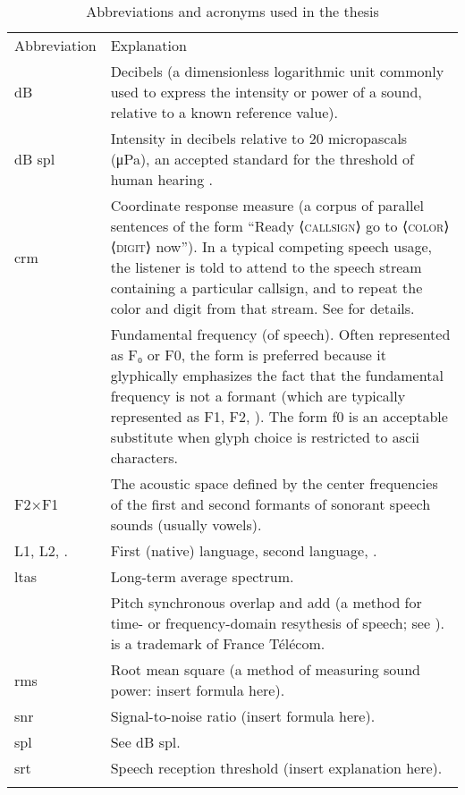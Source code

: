\begin{table}
	\caption[Abbreviations and acronyms]{Abbreviations and acronyms used in the thesis \label{tab:Abbr}}
	\centering
	\begin{tabu} to \textwidth [c]{X[c m] X[5 m]}
		\toprule
		\everyrow{\midrule}
		\rowfont[c]{\bfseries} Abbreviation & Explanation\\
		{dB} & Decibels (a dimensionless logarithmic unit commonly used to express the intensity or power of a sound, relative to a known reference value).\\ 
		{dB \ac{spl}} & Intensity in decibels relative to 20 micropascals (μPa), an accepted standard for the threshold of human hearing .\\
		\ac{crm} & Coordinate response measure (a corpus of parallel sentences of the form “Ready ⟨\textsc{callsign}⟩ go to ⟨\textsc{color}⟩ ⟨\textsc{digit}⟩ now”).  In a typical competing speech usage, the listener is told to attend to the speech stream containing a particular callsign, and to repeat the color and digit from that stream.  See \citet{BoliaEtAl2000} for details.\\
		\fo & Fundamental frequency (of speech).  Often represented as F₀ or F0, the form \fo{} is preferred because it glyphically emphasizes the fact that the fundamental frequency is not a formant (which are typically represented as F1, F2, \etc).  The form f0 is an acceptable substitute when glyph choice is restricted to \ac{ascii} characters.\\
		F2×F1 & The acoustic space defined by the center frequencies of the first and second formants of sonorant speech sounds (usually vowels).\\
		L1, L2, \etc. & First (native) language, second language, \etc.\\
		\ac{ltas} & Long-term average spectrum.\\
		\psola & Pitch synchronous overlap and add (a method for time- or frequency-domain resythesis of speech; see \citealt{CharpentierMoulines1988, MoulinesCharpentier1990}).  \psola{} is a trademark of France Télécom.\\
		\ac{rms} & Root mean square (a method of measuring sound power: insert formula here).\\
		\ac{snr} & Signal-to-noise ratio (insert formula here).\\
		\ac{spl} & See {dB \ac{spl}}.\\
		\everyrow{}
		\ac{srt} & Speech reception threshold (insert explanation here).\\
		\bottomrule
	\end{tabu}
\end{table}
